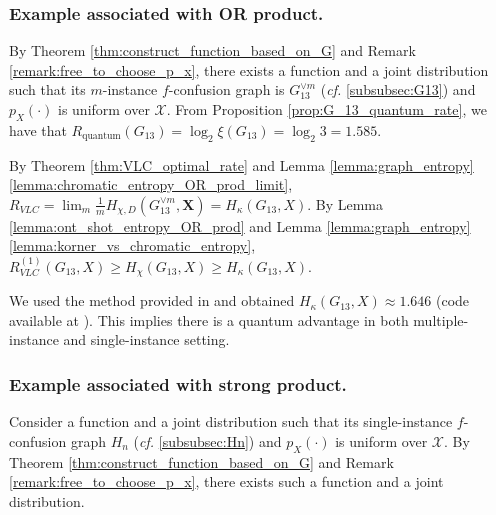 \documentclass[journal, onecolumn, draftcls]{IEEEtran}
\theoremstyle{definition}
\newcommand{\calX}{\mathcal{X}}
\newcommand{\bfX}{\mathbf{X}}
\newcommand{\meng}[1]{\marginpar{+}{\bf Ruoyu's remark}: {\em #1}}
\newcommand{\aditya}[1]{\marginpar{+}{\bf Aditya's remark}: {\em #1}}
\begin{document}
\subsubsection{Example associated with OR product.}  \label{sec:VLC_G13}
By Theorem \ref{thm:construct_function_based_on_G} and Remark \ref{remark:free_to_choose_p_x}, there exists a function and a joint distribution such that its $m$-instance $f$-confusion graph is $G_{13}^{\lor m}$ ({\it cf.} \ref{subsubsec:G13}) and $p_X(\cdot)$ is uniform over $\calX$.  From Proposition \ref{prop:G_13_quantum_rate}, we have that $  R_{\text{quantum}}(G_{13}) = \log_2\xi(G_{13}) = \log_2 3=1.585$. 

 By Theorem \ref{thm:VLC_optimal_rate} and  Lemma \ref{lemma:graph_entropy}     \ref{lemma:chromatic_entropy_OR_prod_limit}, $R_{VLC} = \lim_m\frac{1}{m} H_{\chi,D}(G_{13}^{\lor m},\bfX) = H_{\kappa}(G_{13},X)$. By Lemma \ref{lemma:ont_shot_entropy_OR_prod} and  Lemma \ref{lemma:graph_entropy}  \ref{lemma:korner_vs_chromatic_entropy}, $R_{VLC}^{(1)}(G_{13},X)\ge H_{\chi}(G_{13},X)\ge H_{\kappa}(G_{13},X)$. 


We used the method provided  in \cite{HarangiNB24} and obtained $H_{\kappa}(G_{13},X) \approx 1.646$ (code available at \cite{meng2024github}). %
This implies there is a   quantum advantage in both multiple-instance and single-instance setting. 

\subsubsection{Example associated with strong product.} \label{sec:VLC_Hn}
Consider a function and a joint distribution such that its single-instance $f$-confusion graph $H_n$ ({\it cf.} \ref{subsubsec:Hn}) and $p_X(\cdot)$ is uniform over $\calX$.  By Theorem \ref{thm:construct_function_based_on_G} and Remark \ref{remark:free_to_choose_p_x}, there exists such a function and a joint distribution.
\end{document}

